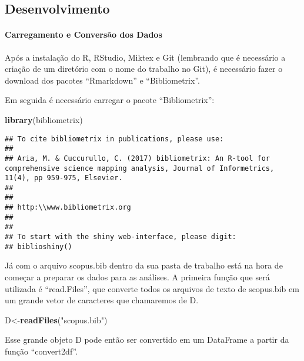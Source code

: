 \documentclass[]{article}
\newenvironment{Shaded}{\begin{snugshade}}{\end{snugshade}}
\newcommand{\KeywordTok}[1]{\textcolor[rgb]{0.13,0.29,0.53}{\textbf{#1}}}
\newcommand{\NormalTok}[1]{#1}
\newcommand{\StringTok}[1]{\textcolor[rgb]{0.31,0.60,0.02}{#1}}
\let\oldparagraph\paragraph
\renewcommand{\paragraph}[1]{\oldparagraph{#1}\mbox{}}
\begin{document}
\hypertarget{desenvolvimento}{%
\subsection{Desenvolvimento}\label{desenvolvimento}}

\hypertarget{carregamento-e-conversao-dos-dados}{%
\paragraph{Carregamento e Conversão dos
Dados}\label{carregamento-e-conversao-dos-dados}}

Após a instalação do R, RStudio, Miktex e Git (lembrando que é
necessário a criação de um diretório com o nome do trabalho no Git), é
necessário fazer o download dos pacotes ``Rmarkdown'' e
``Bibliometrix''.

Em seguida é necessário carregar o pacote ``Bibliometrix'':

\begin{Shaded}
\begin{Highlighting}[]
\KeywordTok{library}\NormalTok{(bibliometrix)}
\end{Highlighting}
\end{Shaded}

\begin{verbatim}
## To cite bibliometrix in publications, please use:
## 
## Aria, M. & Cuccurullo, C. (2017) bibliometrix: An R-tool for comprehensive science mapping analysis, Journal of Informetrics, 11(4), pp 959-975, Elsevier.
##                         
## 
## http:\\www.bibliometrix.org
## 
##                         
## To start with the shiny web-interface, please digit:
## biblioshiny()
\end{verbatim}

Já com o arquivo scopus.bib dentro da sua pasta de trabalho está na hora
de começar a preparar os dados para as análises. A primeira função que
será utilizada é ``read.Files'', que converte todos os arquivos de texto
de scopus.bib em um grande vetor de caracteres que chamaremos de D.

\begin{Shaded}
\begin{Highlighting}[]
\NormalTok{D<-}\KeywordTok{readFiles}\NormalTok{(}\StringTok{"scopus.bib"}\NormalTok{)}
\end{Highlighting}
\end{Shaded}

Esse grande objeto D pode então ser convertido em um DataFrame a partir
da função ``convert2df''.
\end{document}
